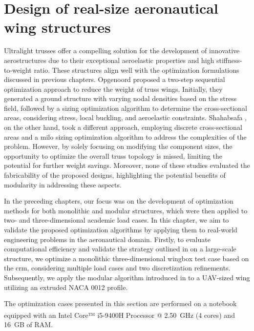 \setchapterpreamble[u]{\margintoc}
\glsresetall %

\chapter{Design of real-size aeronautical wing structures} \label{chap:07}

Ultralight trusses offer a compelling solution for the development of innovative aerostructures due to their exceptional aeroelastic properties and high stiffness-to-weight ratio. These structures align well with the optimization formulations discussed in previous chapters. Opgenoord  proposed a two-step sequential optimization approach to reduce the weight of truss wings. Initially, they generated a ground structure with varying nodal densities based on the stress field, followed by a sizing optimization algorithm to determine the cross-sectional areas, considering stress, local buckling, and aeroelastic constraints. Shahabsafa , on the other hand, took a different approach, employing discrete cross-sectional areas and a \gls{milo} sizing optimization algorithm to address the complexities of the problem. However, by solely focusing on modifying the component sizes, the opportunity to optimize the overall truss topology is missed, limiting the potential for further weight savings. Moreover, none of these studies evaluated the fabricability of the proposed designs, highlighting the potential benefits of modularity in addressing these aspects.

In the preceding chapters, our focus was on the development of optimization methods for both monolithic and modular structures, which were then applied to two- and three-dimensional academic load cases. In this chapter, we aim to validate the proposed optimization algorithms by applying them to real-world engineering problems in the aeronautical domain. Firstly, to evaluate computational efficiency and validate the strategy outlined in  on a large-scale structure, we optimize a monolithic three-dimensional wingbox test case based on the \gls{crm}, considering multiple load cases and two discretization refinements. Subsequently, we apply the modular algorithm introduced in  to a UAV-sized wing utilizing an extruded NACA 0012 profile.

The optimization cases presented in this section are performed on a notebook equipped with an Intel\textsuperscript{\textregistered} Core™ i5-9400H Processor @ \qty{2.50}{GHz} (4 cores) and \qty{16}{GB} of RAM. 

